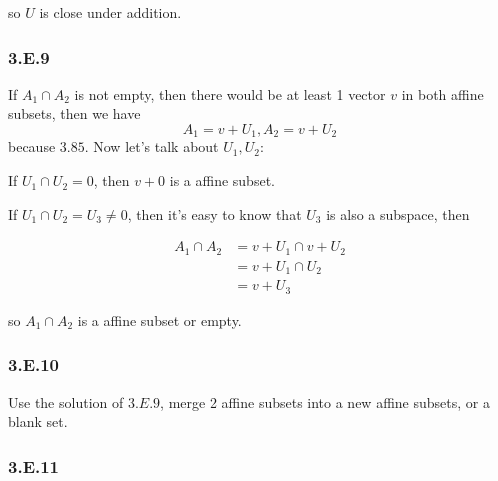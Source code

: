 so $U$ is close under addition.

\subsubsection*{3.E.9}

If $A_{1} \cap A_{2} $ is not empty, then there would be at least 1 vector $v$ in both affine subsets, then we have
\[A_{1} = v + U_{1}, A_{2} = v + U_{2}\] 
because $3.85$. Now let's talk about $U_{1}, U_{2}$: 

If $U_{1} \cap U_{2} = {0}$, then $v + {0}$ is a affine subset.

If $U_{1} \cap U_{2} = U_{3} \neq {0}$, then it's easy to know that $U_{3}$ is also a subspace, then

\begin{equation*}
    \begin{split}
    A_{1} \cap A_{2} &= {v + U_{1}} \cap {v + U_{2}} \\
    &= {v + U_{1}\cap U_{2}} \\
    &= {v + U_{3}}
        \end{split}
\end{equation*}

so $A_{1} \cap A_{2} $ is a affine subset or empty.

\subsubsection*{3.E.10}

Use the solution of $3.E.9$, merge 2 affine subsets into a new affine subsets, or a blank set. 

\subsubsection*{3.E.11}

